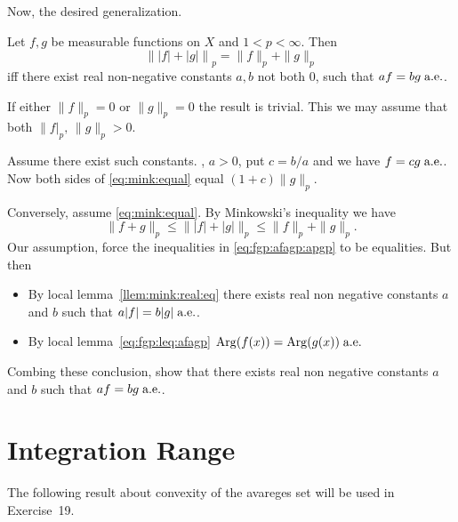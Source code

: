 Now, the desired generalization.
\begin{llem} \label{llem:minkowski:eq}
Let \(f,g\) be measurable functions on $X$ and \(1<p<\infty\).
Then
\begin{equation} \label{eq:mink:equal}
 \left\| |f| + |g| \right\|_p = \|f\|_p + \|g\|_p
\end{equation}
iff there exist
real non-negative constants \(a,b\) not both $0$, such that \(af=bg \;\textrm{a.e.}\).
\end{llem}
\begin{thmproof}
If either \(\|f\|_p=0\) or \(\|g\|_p=0\) the result is trivial.
This we may assume that both \(\|f|_p,\,\|g\|_p>0\).

Assume there exist such constants. \Wlogy, \(a>0\), put \(c=b/a\) and we have
\(f=cg\;\textrm{a.e.}\).
Now both sides of \eqref{eq:mink:equal}
equal \((1+c)\|g\|_p\).

Conversely, assume \eqref{eq:mink:equal}.
By Minkowski's inequality
we have
\begin{equation} \label{eq:fgp:afagp:apgp}
\|f + g\|_p \leq \||f|+|g|\|_p \leq \|f\|_p + \|g\|_p.
\end{equation}
Our assumption, force the  inequalities in \eqref{eq:fgp:afagp:apgp}
to be equalities. But then
\begin{itemize}
\item
By local lemma~\ref{llem:mink:real:eq}
there exists real non negative constants $a$ and $b$ such that
\(a|f| = b|g|\;\textrm{a.e.}\).
\item
By local lemma~\ref{eq:fgp:leq:afagp} \(\mathop{\rm Arg}\nolimits(f(x)) = \mathop{\rm Arg}\nolimits(g(x))\;\textrm{a.e.}\)
\end{itemize}
Combing these conclusion,
show that there exists real non negative constants $a$ and $b$ such that
\(af = bg\;\textrm{a.e.}\).
\end{thmproof}


\section{Integration Range}

The following result about convexity of the avareges set
will be used in Exercise~19.


